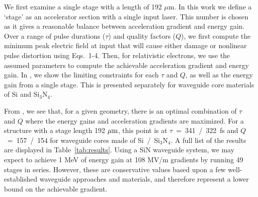 
We first examine a single stage with a length of 192 $\mu$m.  In this work we define a `stage' as an accelerator section with a single input laser. This number is chosen as it gives a reasonable balance between acceleration gradient and energy gain.  Over a range of pulse durations ($\tau$) and quality factors ($Q$), we first compute the minimum peak electric field at input that will cause either damage or nonlinear pulse distortion using Eqs.~1-4.  Then, for relativistic electrons, we use the assumed parameters to compute the achievable acceleration gradient and energy gain.  In , we show the limiting constraints for each $\tau$ and $Q$, as well as the energy gain from a single stage.  This is presented separately for waveguide core materials of Si and Si$_3$N$_4$.

From , we see that, for a given geometry, there is an optimal combination of $\tau$ and $Q$ where the energy gains and acceleration gradients are maximized. For a structure with a stage length 192 $\rm{\mu m}$, this point is at $\tau$~=~341~/~322~fs and $Q$~=~157~/~154 for waveguide cores made of Si~/~Si$_3$N$_4$.  A full list of the results are displayed in Table~\ref{tab:results}.  Using a SiN waveguide system, we may expect to achieve 1 MeV of energy gain at 108 MV/m gradients by running 49 stages in series.  However, these are conservative values based upon a few well-established waveguide approaches and materials, and therefore represent a lower bound on the achievable gradient.

